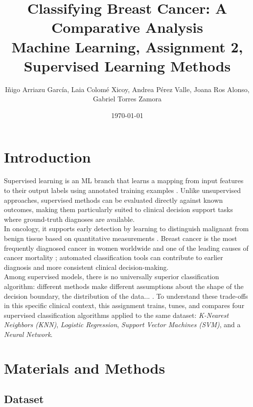 \documentclass[twocolumn, fontsize=10pt]{article}
\title{
\Large
\centering
\textbf{Classifying Breast Cancer: A Comparative Analysis} \\
[8pt]
\Large \textcolor{RCharcoal}{Machine Learning, Assignment 2, Supervised Learning Methods} \\[10pt]}
\date{\today}
\author{{\normalsize Iñigo Arriazu García, Laia Colomé Xicoy, Andrea Pérez Valle, Joana Ros Alonso, Gabriel Torres Zamora }}
\makeatletter
\renewcommand{\maketitle}{\bgroup\setlength{\parindent}{0pt}
\begin{flushleft}
  \@title
  \@author \\
  \@date
\end{flushleft}\egroup
}
\makeatother
\begin{document}
\twocolumn[ \maketitle ]



\section{Introduction}
\label{sec:intro}

{Supervised learning} is an ML branch that learns a mapping from input features to their output labels using annotated training examples \citep{hastie2009elements}. Unlike unsupervised approaches, supervised methods can be evaluated directly against known outcomes, making them particularly suited to clinical decision support tasks where ground-truth diagnoses are available.\\

In oncology, it supports early detection by learning to distinguish malignant from benign tissue based on quantitative measurements \citep{bishop2006pattern}. Breast cancer is the most frequently diagnosed cancer in women worldwide and one of the leading causes of cancer mortality \citep{siegel2023cancer}; automated classification tools can contribute to earlier diagnosis and more consistent clinical decision-making.\\

Among supervised models, there is no universally superior classification algorithm: different methods make different assumptions about the shape of the decision boundary, the distribution of the data... \citep{james2021statistical}. To understand these trade-offs in this specific clinical context, this assignment trains, tunes, and compares four supervised classification algorithms applied to the same dataset: {\textit{K-Nearest Neighbors (KNN)}}, {\textit{Logistic Regression}}, {\textit{Support Vector Machines (SVM)}}, and a {\textit{Neural Network}}.



\section{Materials and Methods}
\label{sec:methods}



\subsection{Dataset}
\end{document}
